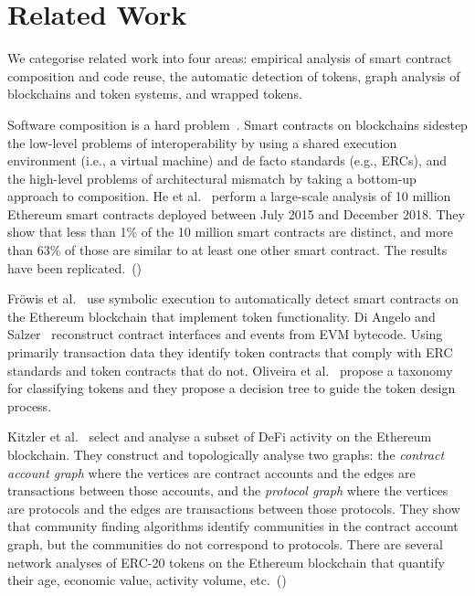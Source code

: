 \section{Related Work}\label{sec:related-work}

We categorise related work into four areas: empirical analysis of
smart contract composition and code reuse, the automatic detection of
tokens, graph analysis of blockchains and token systems, and wrapped
tokens.

Software composition is a hard problem~\cite{garlan-et-al-94}.  Smart
contracts on blockchains sidestep the low-level problems of
interoperability by using a shared execution environment (i.e., a
virtual machine) and de facto standards (e.g., ERCs), and the
high-level problems of architectural mismatch by taking a bottom-up
approach to composition.  He et al.~\cite{he-et-al-20} perform a
large-scale analysis of \num{10} million Ethereum smart contracts
deployed between July 2015 and December 2018.  They show that less
than \num{1}\% of the \num{10} million smart contracts are distinct,
and more than \num{63}\% of those are similar to at least one other
smart contract.  The results have been
replicated.~(\hspace{1sp}\cite{kondo-et-al-20,chen-et-al-21,khan-et-al-22})

Fr\"owis et al.~\cite{frowis-et-al-19} use symbolic execution to
automatically detect smart contracts on the Ethereum blockchain that
implement token functionality.  Di Angelo and
Salzer~\cite{di-angelo-salzer-21} reconstruct contract interfaces and
events from EVM bytecode.  Using primarily transaction data they
identify token contracts that comply with ERC standards and token
contracts that do not.  Oliveira et al.~\cite{oliveira-et-al-18}
propose a taxonomy for classifying tokens and they propose a decision
tree to guide the token design process.

Kitzler et al.~\cite{kitzler-et-al-21} select and analyse a subset of
DeFi activity on the Ethereum blockchain.  They construct and
topologically analyse two graphs: the \textit{contract account graph}
where the vertices are contract accounts and the edges are
transactions between those accounts, and the \textit{protocol graph}
where the vertices are protocols and the edges are transactions
between those protocols.  They show that community finding algorithms
identify communities in the contract account graph, but the
communities do not correspond to protocols.  There are several network
analyses of ERC-20 tokens on the Ethereum blockchain that quantify
their age, economic value, activity volume,
etc.~(\hspace{1sp}\cite{somin-et-al-18,victor-luders-19})

